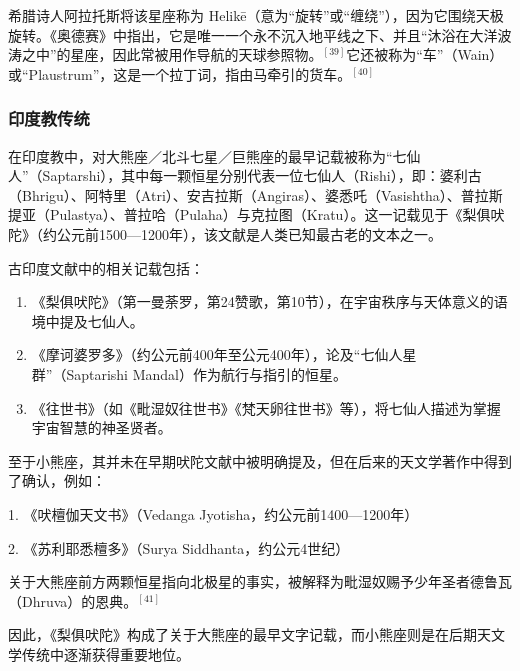 希腊诗人阿拉托斯将该星座称为 Helikē（意为“旋转”或“缠绕”），因为它围绕天极旋转。《奥德赛》中指出，它是唯一一个永不沉入地平线之下、并且“沐浴在大洋波涛之中”的星座，因此常被用作导航的天球参照物。$^{[39]}$它还被称为“车”（Wain）或“Plaustrum”，这是一个拉丁词，指由马牵引的货车。$^{[40]}$
\subsubsection{印度教传统}  
在印度教中，对大熊座／北斗七星／巨熊座的最早记载被称为“七仙人”（Saptarshi），其中每一颗恒星分别代表一位七仙人（Rishi），即：婆利古（Bhrigu）、阿特里（Atri）、安吉拉斯（Angiras）、婆悉吒（Vasishtha）、普拉斯提亚（Pulastya）、普拉哈（Pulaha）与克拉图（Kratu）。这一记载见于《梨俱吠陀》（约公元前1500—1200年），该文献是人类已知最古老的文本之一。

古印度文献中的相关记载包括：
\begin{enumerate}
\item 《梨俱吠陀》（第一曼荼罗，第24赞歌，第10节），在宇宙秩序与天体意义的语境中提及七仙人。
\item 《摩诃婆罗多》（约公元前400年至公元400年），论及“七仙人星群”（Saptarishi Mandal）作为航行与指引的恒星。
\item 《往世书》（如《毗湿奴往世书》《梵天卵往世书》等），将七仙人描述为掌握宇宙智慧的神圣贤者。
\end{enumerate}

至于小熊座，其并未在早期吠陀文献中被明确提及，但在后来的天文学著作中得到了确认，例如：

1. 《吠檀伽天文书》（Vedanga Jyotisha，约公元前1400—1200年）

2. 《苏利耶悉檀多》（Surya Siddhanta，约公元4世纪）

关于大熊座前方两颗恒星指向北极星的事实，被解释为毗湿奴赐予少年圣者德鲁瓦（Dhruva）的恩典。$^{[41]}$

因此，《梨俱吠陀》构成了关于大熊座的最早文字记载，而小熊座则是在后期天文学传统中逐渐获得重要地位。
